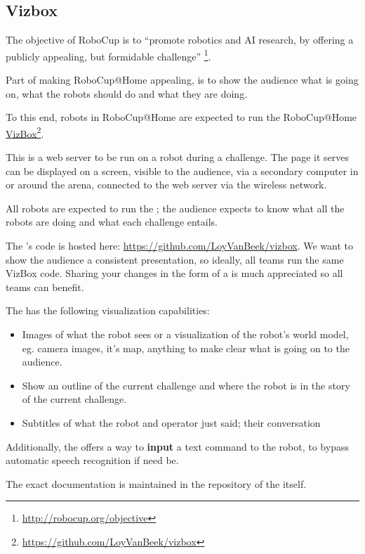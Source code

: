 \subsection{Vizbox}
\label{vizbox}

The objective of RoboCup is to \enquote{promote robotics and AI research, by offering a publicly appealing, but formidable challenge} \footnote{\url{http://robocup.org/objective}}.

Part of making RoboCup@Home appealing, is to show the audience what is going on, what the robots should do and what they are doing.

To this end, robots in RoboCup@Home are expected to run the RoboCup@Home \href{https://github.com/LoyVanBeek/vizbox}{VizBox}\footnote{\url{https://github.com/LoyVanBeek/vizbox}}.

This is a web server to be run on a robot during a challenge. The page it serves can be displayed on a screen, visible to the audience, via a secondary computer in or around the arena, connected to the web server via the wireless network.

All robots are expected to run the ; the audience expects to know what all the robots are doing and what each challenge entails.

The 's code is hosted here: \url{https://github.com/LoyVanBeek/vizbox}.
We want to show the audience a consistent presentation, so ideally, all teams run the same VizBox code.
Sharing your changes in the form of a  is much appreciated so all teams can benefit.

The  has the following visualization capabilities:
\begin{itemize}
	\item Images of what the robot sees or a visualization of the robot's world model, eg. camera images, it's map, anything to make clear what is going on to the audience.
	\item Show an outline of the current challenge and where the robot is in the story of the current challenge.
	\item Subtitles of what the robot and operator just said; their conversation
\end{itemize}

Additionally, the  offers a way to \textbf{input} a text command to the robot, to bypass automatic speech recognition if need be.

The exact documentation is maintained in the repository of the  itself.